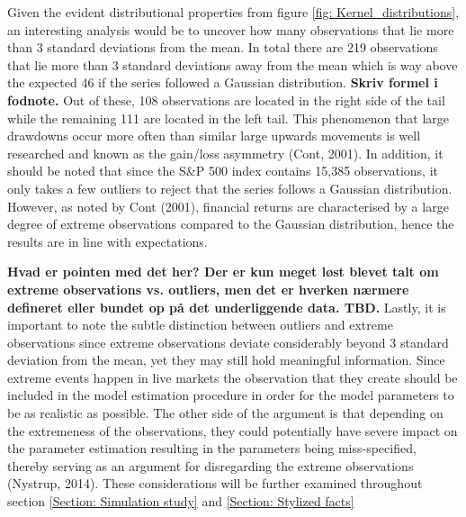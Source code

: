 Given the evident distributional properties from figure \ref{fig: Kernel_distributions}, an interesting analysis would be to uncover how many observations that lie more than 3 standard deviations from the mean. In total there are 219 observations that lie more than 3 standard deviations away from the mean which is way above the expected 46 if the series followed a Gaussian distribution. \textbf{Skriv formel i fodnote.} Out of these, 108 observations are located in the right side of the tail while the remaining 111 are located in the left tail. This phenomenon that large drawdowns occur more often than similar large upwards movements is well researched and known as the gain/loss asymmetry (Cont, 2001). In addition, it should be noted that since the S\&P 500 index contains 15,385 observations, it only takes a few outliers to reject that the series follows a Gaussian distribution. However, as noted by Cont (2001), financial returns are characterised by a large degree of extreme observations compared to the Gaussian distribution, hence the results are in line with expectations.


\textbf{Hvad er pointen med det her? Der er kun meget løst blevet talt om extreme observations vs. outliers, men det er hverken nærmere defineret eller bundet op på det underliggende data. TBD.}
Lastly, it is important to note the subtle distinction between outliers and extreme observations since extreme observations deviate considerably beyond 3 standard deviation from the mean, yet they may still hold meaningful information. Since extreme events happen in live markets the observation that they create should be included in the model estimation procedure in order for the model parameters to be as realistic as possible. The other side of the argument is that depending on the extremeness of the observations, they could potentially have severe impact on the parameter estimation resulting in the parameters being miss-specified, thereby serving as an argument for disregarding the extreme observations (Nystrup, 2014). These considerations will be further examined throughout section \ref{Section: Simulation study} and \ref{Section: Stylized facts}


\label{subsection: distributional properties}

